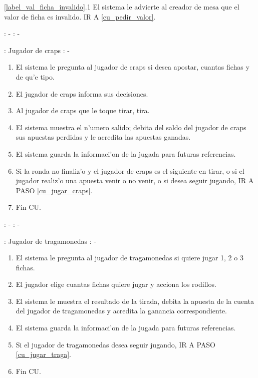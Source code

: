 
\ref{label_val_ficha_invalido}.1 El sistema le advierte al creador de mesa que el valor de ficha es invalido. IR A \ref{cu_pedir_valor}.





: - \newline
\indent{}: -

: Jugador de craps \newline
\indent{}: -

\begin{enumerate}
\item El sistema le pregunta al jugador de craps si desea apostar, cuantas fichas y de qu'e tipo. \label{cu_jugar_craps}
\item El jugador de craps informa sus decisiones.
\item Al jugador de craps que le toque tirar, tira.
\item El sistema muestra el n'umero salido; debita del saldo del jugador de craps sus apuestas perdidas y le acredita las apuestas ganadas.
\item El sistema guarda la informaci'on de la jugada para futuras referencias.
\item Si la ronda no finaliz'o y el jugador de craps es el siguiente en tirar, o si el jugador realiz'o una apuesta venir o no venir, o si desea seguir jugando, IR A PASO \ref{cu_jugar_craps}.
\item Fin CU.
\end{enumerate}



: - \newline
\indent{}: -

: Jugador de tragamonedas \newline
\indent{}: -

\begin{enumerate}
\item El sistema le pregunta al jugador de tragamonedas si quiere jugar 1, 2 o 3 fichas. \label{cu_jugar_traga}
\item El jugador elige cuantas fichas quiere jugar y acciona los rodillos.
\item El sistema le muestra el resultado de la tirada, debita la apuesta de la cuenta del jugador de tragamonedas y acredita la ganancia correspondiente.
\item El sistema guarda la informaci'on de la jugada para futuras referencias.
\item Si el jugador de tragamonedas desea seguir jugando, IR A PASO \ref{cu_jugar_traga}.
\item Fin CU.
\end{enumerate}




